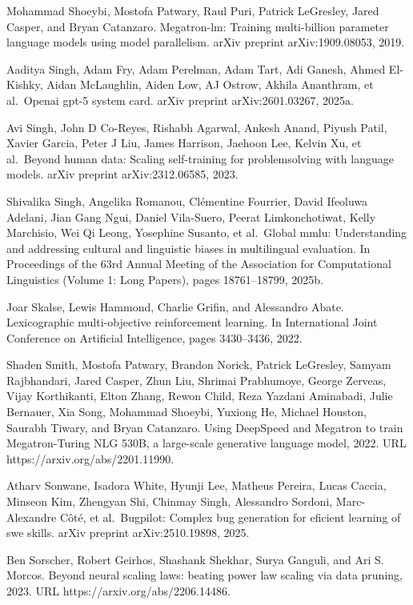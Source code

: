 \documentclass[
  10
]{article}
\begin{document}
Mohammad Shoeybi, Mostofa Patwary, Raul Puri, Patrick LeGresley, Jared
Casper, and Bryan Catanzaro. Megatron-lm: Training multi-billion
parameter language models using model parallelism. arXiv preprint
arXiv:1909.08053, 2019.

Aaditya Singh, Adam Fry, Adam Perelman, Adam Tart, Adi Ganesh, Ahmed
El-Kishky, Aidan McLaughlin, Aiden Low, AJ Ostrow, Akhila Ananthram, et
al.~Openai gpt-5 system card. arXiv preprint arXiv:2601.03267, 2025a.

Avi Singh, John D Co-Reyes, Rishabh Agarwal, Ankesh Anand, Piyush Patil,
Xavier Garcia, Peter J Liu, James Harrison, Jaehoon Lee, Kelvin Xu, et
al.~Beyond human data: Scaling self-training for problemsolving with
language models. arXiv preprint arXiv:2312.06585, 2023.

Shivalika Singh, Angelika Romanou, Clémentine Fourrier, David Ifeoluwa
Adelani, Jian Gang Ngui, Daniel Vila-Suero, Peerat Limkonchotiwat, Kelly
Marchisio, Wei Qi Leong, Yosephine Susanto, et al.~Global mmlu:
Understanding and addressing cultural and linguistic biases in
multilingual evaluation. In Proceedings of the 63rd Annual Meeting of
the Association for Computational Linguistics (Volume 1: Long Papers),
pages 18761--18799, 2025b.

Joar Skalse, Lewis Hammond, Charlie Grifin, and Alessandro Abate.
Lexicographic multi-objective reinforcement learning. In International
Joint Conference on Artificial Intelligence, pages 3430--3436, 2022.

Shaden Smith, Mostofa Patwary, Brandon Norick, Patrick LeGresley, Samyam
Rajbhandari, Jared Casper, Zhun Liu, Shrimai Prabhumoye, George Zerveas,
Vijay Korthikanti, Elton Zhang, Rewon Child, Reza Yazdani Aminabadi,
Julie Bernauer, Xia Song, Mohammad Shoeybi, Yuxiong He, Michael Houston,
Saurabh Tiwary, and Bryan Catanzaro. Using DeepSpeed and Megatron to
train Megatron-Turing NLG 530B, a large-scale generative language model,
2022. URL https://arxiv.org/abs/2201.11990.

Atharv Sonwane, Isadora White, Hyunji Lee, Matheus Pereira, Lucas
Caccia, Minseon Kim, Zhengyan Shi, Chinmay Singh, Alessandro Sordoni,
Marc-Alexandre Côté, et al.~Bugpilot: Complex bug generation for
eficient learning of swe skills. arXiv preprint arXiv:2510.19898, 2025.

Ben Sorscher, Robert Geirhos, Shashank Shekhar, Surya Ganguli, and Ari
S. Morcos. Beyond neural scaling laws: beating power law scaling via
data pruning, 2023. URL https://arxiv.org/abs/2206.14486.
\end{document}
